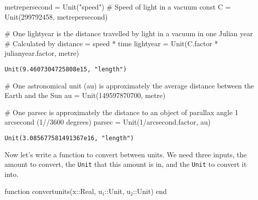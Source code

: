 \documentclass[
  letterpaper,
  DIV=11,
  numbers=noendperiod]{scrreprt}
\newenvironment{Shaded}{\begin{snugshade}}{\end{snugshade}}
\newcommand{\CommentTok}[1]{\textcolor[rgb]{0.37,0.37,0.37}{#1}}
\newcommand{\DataTypeTok}[1]{\textcolor[rgb]{0.68,0.00,0.00}{#1}}
\newcommand{\FloatTok}[1]{\textcolor[rgb]{0.68,0.00,0.00}{#1}}
\newcommand{\FunctionTok}[1]{\textcolor[rgb]{0.28,0.35,0.67}{#1}}
\newcommand{\KeywordTok}[1]{\textcolor[rgb]{0.00,0.23,0.31}{#1}}
\newcommand{\NormalTok}[1]{\textcolor[rgb]{0.00,0.23,0.31}{#1}}
\newcommand{\OperatorTok}[1]{\textcolor[rgb]{0.37,0.37,0.37}{#1}}
\newcommand{\StringTok}[1]{\textcolor[rgb]{0.13,0.47,0.30}{#1}}
\begin{document}
\begin{Shaded}
\begin{Highlighting}[]
\NormalTok{metrepersecond }\OperatorTok{=} \FunctionTok{Unit}\NormalTok{(}\StringTok{"speed"}\NormalTok{)}
\CommentTok{\# Speed of light in a vacuum}
\KeywordTok{const}\NormalTok{ C }\OperatorTok{=} \FunctionTok{Unit}\NormalTok{(}\FloatTok{299792458}\NormalTok{, metrepersecond)}

\CommentTok{\# One lightyear is the distance travelled by light in a vacuum in one Julian year}
\CommentTok{\# Calculated by distance = speed * time}
\NormalTok{lightyear }\OperatorTok{=} \FunctionTok{Unit}\NormalTok{(C.factor }\OperatorTok{*}\NormalTok{ julianyear.factor, metre)}
\end{Highlighting}
\end{Shaded}

\begin{verbatim}
Unit(9.4607304725808e15, "length")
\end{verbatim}

\begin{Shaded}
\begin{Highlighting}[]
\CommentTok{\# One astronomical unit (au) is approximately the average distance between the Earth and the Sun}
\NormalTok{au }\OperatorTok{=} \FunctionTok{Unit}\NormalTok{(}\FloatTok{149597870700}\NormalTok{, metre)}

\CommentTok{\# One parsec is approximately the distance to an object of parallax angle 1 arcsecond (1//3600 degrees)}
\NormalTok{parsec }\OperatorTok{=} \FunctionTok{Unit}\NormalTok{(}\FloatTok{1}\OperatorTok{/}\NormalTok{arcsecond.factor, au)}
\end{Highlighting}
\end{Shaded}

\begin{verbatim}
Unit(3.085677581491367e16, "length")
\end{verbatim}

Now let's write a function to convert between units. We need three
inputs, the amount to convert, the \texttt{Unit} that this amount is in,
and the \texttt{Unit} to convert it into.

\begin{Shaded}
\begin{Highlighting}[]
\KeywordTok{function} \FunctionTok{convertunits}\NormalTok{(x}\OperatorTok{::}\DataTypeTok{Real}\NormalTok{, u₁}\OperatorTok{::}\DataTypeTok{Unit}\NormalTok{, u₂}\OperatorTok{::}\DataTypeTok{Unit}\NormalTok{)}
\KeywordTok{end}
\end{Highlighting}
\end{Shaded}
\end{document}
